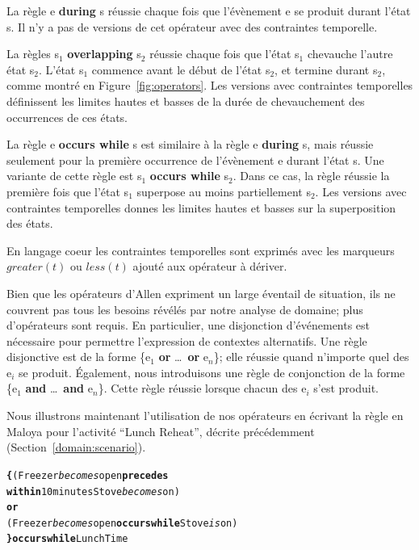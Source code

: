 La règle {\ttfamily e {\bf during} s} réussie chaque fois que l'évènement {\ttfamily e} se produit durant l'état {\ttfamily s}. Il n'y a pas de versions de cet opérateur avec des contraintes temporelle.

La règles {\ttfamily s$_1$ {\bf overlapping} s$_2$} réussie chaque fois que l'état {\ttfamily s$_1$} chevauche l'autre état {\ttfamily s$_2$}. L'état {\ttfamily s$_1$} commence avant le début de l'état {\ttfamily s$_2$}, et termine durant {\ttfamily s$_2$}, comme montré en Figure~\ref{fig:operators}. Les versions avec contraintes temporelles définissent les limites hautes et basses de la durée de chevauchement des occurrences de ces états.

La règle {\ttfamily e {\bf occurs while} s} est similaire à la règle {\ttfamily e {\bf during} s}, mais réussie seulement pour la première occurrence de l'évènement {\ttfamily e} durant l'état {\ttfamily s}. Une variante de cette règle est {\ttfamily s$_1$ {\bf occurs while} s$_2$}. Dans ce cas, la règle réussie la première fois que l'état {\ttfamily s$_1$} superpose au moins partiellement {\ttfamily s$_2$}. Les versions avec contraintes temporelles donnes les limites hautes et basses sur la superposition des états.

En langage coeur les contraintes temporelles sont exprimés avec les marqueurs $greater(t)$ ou $less(t)$ ajouté aux opérateur à dériver.

Bien que les opérateurs d'Allen expriment un large éventail de situation, ils ne couvrent pas tous les besoins révélés par notre analyse de domaine; plus d'opérateurs sont requis. En particulier, une disjonction d'événements est nécessaire pour permettre l'expression de contextes alternatifs. Une règle disjonctive est de la forme {\ttfamily \{e$_1$ {\bf or} \ldots~{\bf or} e$_n$\}}; elle réussie quand n'importe quel des {\ttfamily e$_i$} se produit. Également, nous introduisons une règle de conjonction de la forme {\ttfamily \{e$_1$ {\bf and} \ldots~{\bf and} e$_n$\}}. Cette règle réussie lorsque chacun des {\ttfamily e$_i$} s'est produit.

Nous illustrons maintenant l'utilisation de nos opérateurs en écrivant la règle en Maloya pour l'activité ``Lunch Reheat'', décrite précédemment (Section~\ref{domain:scenario}). 

\footnotesize
\begin{alltt}
{\bf \{} ( Freezer {\itshape becomes} open {\bf precedes} 
    {\bf within} 10 minutes Stove {\itshape becomes} on )
  {\bf or}
  ( Freezer {\itshape becomes} open {\bf occurs while} Stove{\itshape is} on )
{\bf \} occurs while} LunchTime
\end{alltt}
\normalsize

